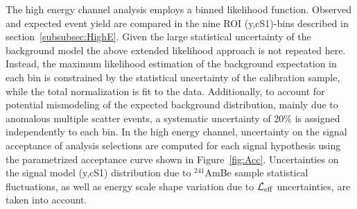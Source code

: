 The high energy channel analysis employs a binned likelihood function. Observed and expected event yield are compared in the nine ROI (y,cS1)-bins described in section~\ref{subsubsec:HighE}. 
Given the large statistical uncertainty of the background model the above extended likelihood approach is not repeated here.
Instead, the maximum likelihood estimation of the background expectation in each bin is constrained by the statistical uncertainty of the calibration sample, while the total 
normalization is fit to the data. Additionally, to account for potential mismodeling of the expected background distribution, mainly due to anomalous multiple scatter events,
a systematic uncertainty of 20\% is assigned independently to each bin. In the high energy channel, uncertainty on the signal acceptance of analysis selections are computed for each signal hypothesis using the parametrized acceptance curve shown in Figure~\ref{fig:Acc}.
Uncertainties on the signal model (y,cS1) distribution due to $^{241}$AmBe sample statistical fluctuations, as well as energy scale shape variation due to $\mathcal{L}_{\mathrm{eff}}$ uncertainties, are taken into account.



